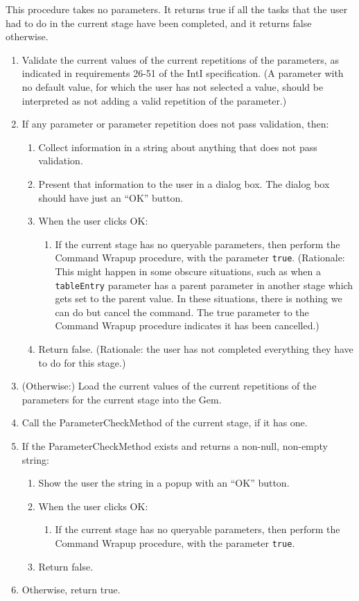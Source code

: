 \documentclass[11pt]{article}
\begin{document}
This procedure takes no parameters.  It returns true if all the tasks
that the user had to do in the current stage have been completed, and
it returns false otherwise.
\begin{enumerate}
\item Validate the current values of the current repetitions of the
  parameters, as indicated in requirements 26-51 of the IntI
  specification.  (A parameter with no default value, for which the user
  has not selected a value, should be interpreted as not adding a valid
  repetition of the parameter.)
\item If any parameter or parameter repetition does not pass validation,
  then:
  \begin{enumerate}
  \item Collect information in a string about anything that does
    not pass validation.
  \item Present that information to the user in a dialog box.
    The dialog box should have just an ``OK'' button.
  \item When the user clicks OK:
    \begin{enumerate}
    \item If the current stage has no queryable
      parameters, then perform the Command Wrapup procedure, with the
      parameter {\tt true}.  (Rationale:  This might happen in some obscure
      situations, such as when a {\tt tableEntry} parameter has a parent
      parameter in another stage which gets set to the parent value.  In
      these situations, there is nothing we can do but cancel the command.
      The true parameter to the Command Wrapup procedure indicates it has
      been cancelled.)
    \end{enumerate}
  \item Return false.  (Rationale:  the
    user has not completed everything they have to do for this stage.)
  \end{enumerate}
\item (Otherwise:) Load the current values of the current repetitions of
  the parameters for the current stage into the Gem.
\item Call the ParameterCheckMethod of the current stage, if it has one.
\item If the ParameterCheckMethod exists and returns a non-null, non-empty
  string:
  \begin{enumerate}
  \item Show the user the string in a popup with an ``OK'' button.
  \item When the user clicks OK:
    \begin{enumerate}
    \item If the current stage has no queryable
      parameters, then perform the Command Wrapup procedure, with the
      parameter {\tt true}.
    \end{enumerate}
  \item Return false.
  \end{enumerate}
\item Otherwise, return true.
\end{enumerate}
\end{document}
